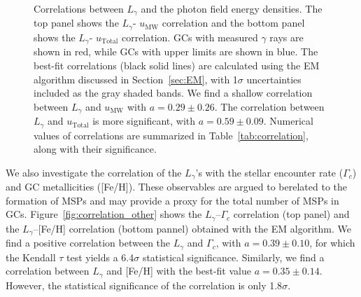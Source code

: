 \documentclass[doublespace,draft,nopageskip]{VTthesis} %
\begin{document}
\begin{figure}
    \caption{\label{fig:correlation_urad} Correlations between $L_\gamma$ and the photon field energy densities. The top panel shows the $L_\gamma$- $u_\mathrm{MW}$ correlation and the bottom panel shows the $L_\gamma$- $u_\mathrm{Total}$ correlation. GCs with measured $\gamma$ rays are shown in red, while GCs with upper limits are shown in blue. The best-fit correlations (black solid lines) are calculated using the EM algorithm discussed in Section~\ref{sec:EM}, with 1$\sigma$ uncertainties included as the gray shaded bands. We find a shallow correlation between $L_\gamma$ and $u_\mathrm{MW}$ with $a = 0.29 \pm 0.26$. The correlation between $L_\gamma$ and $u_\mathrm{Total}$ is more significant, with $a = 0.59 \pm 0.09$. Numerical values of correlations are summarized in Table~\ref{tab:correlation}, along with their significance.
    }
\end{figure}

We also investigate the correlation of the $L_\gamma$'s with the stellar encounter rate ($\Gamma_c$) and GC metallicities ([Fe/H]). These observables are argued to berelated to the formation of MSPs and may provide a proxy for the total number of MSPs in GCs. Figure~\ref{fig:correlation_other} shows the $L_\gamma$--$\Gamma_c$ correlation (top panel) and the $L_\gamma$--[Fe/H] correlation (bottom pannel) obtained with the EM algorithm. We find a positive correlation between the $L_\gamma$ and $\Gamma_c$, with $a = 0.39 \pm 0.10$, for which the Kendall $\tau$ test yields a 6.4$\sigma$ statistical significance. Similarly, we find a correlation between $L_\gamma$ and [Fe/H] with the best-fit value $a = 0.35 \pm 0.14$. However, the statistical significance of the correlation is only 1.8$\sigma$. 
\end{document}
